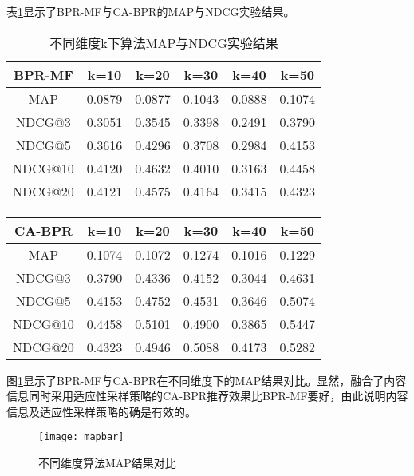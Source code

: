 表\ref{tab:mapandndcg}显示了BPR-MF与CA-BPR的MAP与NDCG实验结果。
\begin{table}[htbp]
	\caption{不同维度k下算法MAP与NDCG实验结果}
	\label{tab:mapandndcg}
	\begin{center}
		\begin{tabular}{|c | c |c |c|c|c|}
			\hline
			BPR-MF  &   k=10 &   k=20 &    k=30&    k=40&    k=50\\
			\hline
			MAP      &  0.0879&  0.0877&  0.1043&  0.0888&  0.1074\\
			\hline
			NDCG@3   &  0.3051&  0.3545&  0.3398&  0.2491&  0.3790\\
			NDCG@5   &  0.3616&  0.4296&  0.3708&  0.2984&  0.4153\\
			NDCG@10  &  0.4120&  0.4632&  0.4010&  0.3163&  0.4458\\
			NDCG@20  &  0.4121&  0.4575&  0.4164&  0.3415&  0.4323\\
			\hline
		\end{tabular}
		
	\end{center}
\end{table}
\begin{table}[htbp]
		\vspace{-1em}
		\begin{center}
			
		\begin{tabular}{|c | c |c |c|c|c|}
			\hline
			CA-BPR  &     k=10&   k=20 &    k=30&  k=40 &   k=50  \\
			\hline
			MAP     &   0.1074&  0.1072&  0.1274&  0.1016&  0.1229\\
			\hline
			NDCG@3  &   0.3790&  0.4336&  0.4152&  0.3044&  0.4631\\
			NDCG@5  &   0.4153&  0.4752&  0.4531&  0.3646&  0.5074\\
			NDCG@10 &   0.4458&  0.5101&  0.4900&  0.3865&  0.5447\\
			NDCG@20 &   0.4323&  0.4946&  0.5088&  0.4173&  0.5282\\
			\hline
		\end{tabular}
	\end{center}
\end{table}

图\ref{fig:map}显示了BPR-MF与CA-BPR在不同维度下的MAP结果对比。显然，融合了内容信息同时采用适应性采样策略的CA-BPR推荐效果比BPR-MF要好，由此说明内容信息及适应性采样策略的确是有效的。
\begin{figure}[htbp]
	\begin{center}
	\texttt{[image: mapbar]}
\end{center}
\caption{不同维度算法MAP结果对比}
\label{fig:map}
\end{figure}
